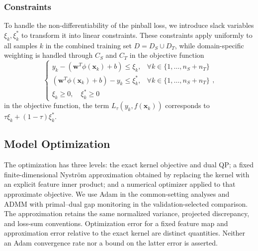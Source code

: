 \documentclass[a4paper]{cas-sc}
\begin{document}
\subsubsection{Constraints}
To handle the non-differentiability of the pinball loss, we introduce slack variables $\xi_k, \xi_k^*$ to transform it into linear constraints. These constraints apply uniformly to all samples $k$ in the combined training set $D = D_S \cup D_T$, while domain-specific weighting is handled through $C_S$ and $C_T$ in the objective function
\begin{equation}
\label{eq:constraints}
\begin{cases}
y_k - (\boldsymbol{w}^T\phi(\boldsymbol{x}_k) + b) \le \xi_k, & \forall k \in \{1, \dots, n_S + n_T\} \\
(\boldsymbol{w}^T\phi(\boldsymbol{x}_k) + b) - y_k \le \xi_k^*, & \forall k \in \{1, \dots, n_S + n_T\} \\
\xi_k \ge 0, \quad \xi_k^* \ge 0
\end{cases},
\end{equation}
in the objective function, the term $L_{\tau}(y_k, f(\boldsymbol{x}_k))$ corresponds to $\tau \xi_k + (1-\tau) \xi_k^*$.

\subsection{Model Optimization}\label{optimization}
{\color{blue}The optimization has three levels: the exact kernel objective and dual QP; a fixed finite-dimensional Nystr\"{o}m approximation obtained by replacing the kernel with an explicit feature inner product; and a numerical optimizer applied to that approximate objective. We use Adam in the common-setting analyses and ADMM with primal--dual gap monitoring in the validation-selected comparison. The approximation retains the same normalized variance, projected discrepancy, and loss-sum conventions. Optimization error for a fixed feature map and approximation error relative to the exact kernel are distinct quantities. Neither an Adam convergence rate nor a bound on the latter error is asserted.}
\end{document}
